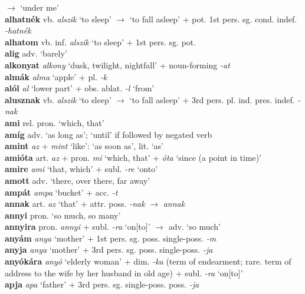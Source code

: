\documentclass[11pt]{article}
\begin{document}
$\rightarrow$ `under me' \\
\textbf{alhatnék} vb. \emph{alszik}
`to sleep' $\rightarrow$ `to fall asleep' + pot. 1st
pers. sg. cond. indef. \emph{-hatnék} \\
\textbf{alhatom} vb. inf. \emph{alszik} `to sleep' + 1st pers. sg. pot. \\
\textbf{alig} adv. `barely' \\
\textbf{alkonyat} \emph{alkony} `dusk, twilight, nightfall' +
noun\hyp{}forming \emph{-at} \\
\textbf{almák} \emph{alma} `apple' + pl. \emph{-k} \\
\textbf{alól} \emph{al} `lower part' + obs. ablat. \emph{-l} `from' \\
\textbf{alusznak} vb. \emph{alszik} `to sleep' $\rightarrow$ `to fall
asleep' + 3rd pers. pl. ind. pres. indef. \emph{-nak} \\
\textbf{ami} rel. pron. `which, that' \\
\textbf{amíg} adv. `as long as'; `until' if followed by negated
verb \\
\textbf{amint} \emph{az} + \emph{mint} `like': `as soon as',
lit. `as' \\
\textbf{amióta} art. \emph{az} + pron. \emph{mi} `which, that'
+ \emph{óta} `since (a point in time)' \\
\textbf{amire} \emph{ami} `that, which' + subl. \emph{-re} `onto' \\
\textbf{amott} adv. `there, over there, far away' \\
\textbf{ampát} \emph{ampa} `bucket' + acc. \emph{-t} \\
\textbf{annak} art. \emph{az} `that' + attr. poss. \emph{-nak}
  $\rightarrow$ \emph{annak} \\
\textbf{annyi} pron. `so much, so many' \\
\textbf{annyira} pron. \emph{annyi} + subl. \emph{-ra}
`on[to]' $\rightarrow$ adv. `so much' \\
\textbf{anyám} \emph{anya} `mother' + 1st
pers. sg. poss. single\hyp{}poss. \emph{-m} \\
\textbf{anyja} \emph{anya} `mother' + 3rd
pers. sg. poss. single\hyp{}poss. \emph{-ja} \\
\textbf{anyókára} \emph{anyó} `elderly woman' + dim. \emph{-ka} (term
of endearment; rare. term of address to the wife by her husband in old
age) + subl. \emph{-ra} `on[to]' \\
\textbf{apja} \emph{apa} `father' + 3rd
pers. sg. single\hyp{}poss. poss. \emph{-ja} \\
\end{document}
